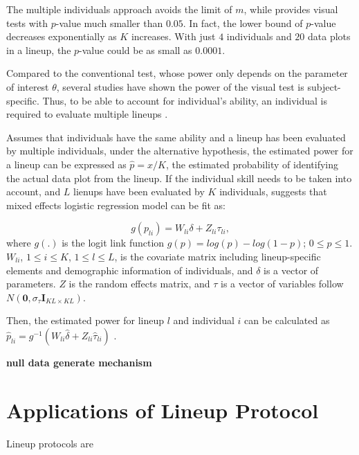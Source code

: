 \documentclass{monashthesis}
\begin{document}
The multiple individuals approach avoids the limit of \(m\), while provides visual tests with \(p\)-value much smaller than \(0.05\). In fact, the lower bound of \(p\)-value decreases exponentially as \(K\) increases. With just \(4\) individuals and \(20\) data plots in a lineup, the \(p\)-value could be as small as \(0.0001\).

Compared to the conventional test, whose power only depends on the parameter of interest \(\theta\), several studies \autocites[see][]{hofmann_graphical_2012,majumder_validation_2013,majumder_human_2014,roy_chowdhury_using_2015,loy_variations_2016} have shown the power of the visual test is subject-specific. Thus, to be able to account for individual's ability, an individual is required to evaluate multiple lineups \autocite{majumder_validation_2013}.

Assumes that individuals have the same ability and a lineup has been evaluated by multiple individuals, under the alternative hypothesis, the estimated power for a lineup can be expressed as \(\hat{p} = x/K\), the estimated probability of identifying the actual data plot from the lineup. If the individual skill needs to be taken into account, and \(L\) lienups have been evaluated by \(K\) individuals, \textcite{majumder_validation_2013} suggests that mixed effects logistic regression model can be fit as:

\[g(p_{li}) = W_{li}\delta + Z_{li}\tau_{li},\]
where \(g(.)\) is the logit link function \(g(p) = log(p) - log(1-p)\); \(0 \leq p \leq 1\). \(W_{li}\), \(1 \leq i \leq K\), \(1 \leq l \leq L\), is the covariate matrix including lineup-specific elements and demographic information of individuals, and \(\delta\) is a vector of parameters. \(Z\) is the random effects matrix, and \(\tau\) is a vector of variables follow \(N(\boldsymbol{0},\sigma_{\tau}\boldsymbol{I}_{KL\times KL})\).

Then, the estimated power for lineup \(l\) and individual \(i\) can be calculated as \(\hat{p}_{li} = g^{-1}(W_{li}\hat{\delta} + Z_{li}\hat{\tau}_{li})\) \autocite{majumder_validation_2013}.

\textbf{null data generate mechanism}

\hypertarget{applications-of-lineup-protocol}{%
\section{Applications of Lineup Protocol}\label{applications-of-lineup-protocol}}

Lineup protocols are
\end{document}
